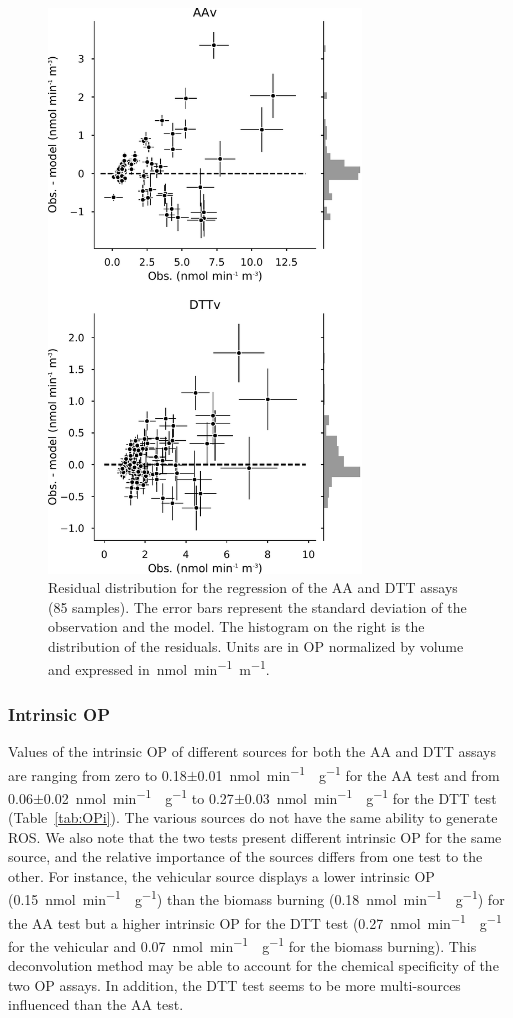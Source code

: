 \documentclass[acp, manuscript]{copernicus}
\begin{document}
\begin{figure}[h]
    \centering
    \includegraphics[width=8.3cm]{figures/fig05_v}
    \caption{Residual distribution for the regression of the AA and DTT assays
        (85 samples). The error bars represent the standard deviation of the
        observation and the model. The histogram on the right is the
        distribution of the residuals. Units are in OP normalized by volume and
        expressed in~\unit{nmol~min^{-1}~m^{-1}}.}
    \label{fig:residual}
\end{figure}

\subsubsection{Intrinsic OP}\label{intrinsic-op}

Values of the intrinsic OP of different sources for both the AA and DTT assays
are ranging from zero to 0.18$\pm$0.01~\unit{nmol~min^{-1}~\mu g^{-1}} for the AA test and from
0.06$\pm$0.02~\unit{nmol~min^{-1}~\mu g^{-1}} to 0.27$\pm$0.03~\unit{nmol~min^{-1}~\mu g^{-1}} for the DTT test
(Table~\ref{tab:OPi}). The various sources do not have the same ability to generate ROS. We also
note that the two tests present different intrinsic OP for the same source, and
the relative importance of the sources differs from one test to the other. For
instance, the vehicular source displays a lower intrinsic OP (0.15~\unit{nmol~min^{-1}~\mu g^{-1}})
than the biomass burning (0.18~\unit{nmol~min^{-1}~\mu g^{-1}}) for the AA test but a higher
intrinsic OP for the DTT test (0.27~\unit{nmol~min^{-1}~\mu g^{-1}} for the vehicular and
0.07~\unit{nmol~min^{-1}~\mu g^{-1}} for the biomass burning).  This deconvolution method may be
able to account for the chemical specificity of the two OP assays. In addition,
the DTT test seems to be more multi-sources influenced than the AA test.
\end{document}
